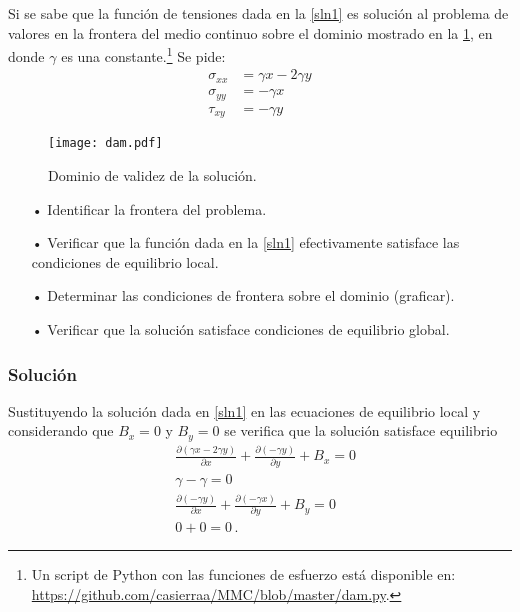 \documentclass[../notas medios.tex]{subfiles}
\begin{document}
Si se sabe que la función de tensiones dada en la \cref{sln1} es solución al problema de valores en la frontera del medio continuo sobre el dominio mostrado en la \cref{dam}, en donde $\gamma$ es una constante.\footnote{Un script de Python con las funciones de esfuerzo está disponible en: \url{https://github.com/casierraa/MMC/blob/master/dam.py}.} Se pide:
\begin{equation}
\begin{split}
\sigma_{xx} & = \gamma x - 2\gamma y \\
\sigma_{yy} & =  - \gamma x \\
\tau_{xy}   & =  - \gamma y
\end{split}
\label{sln1}
\end{equation}

\begin{figure}[H]
\centering
	\texttt{[image: dam.pdf]}
	\caption{Dominio de validez de la solución.}
	\label{dam}
\end{figure}


\begin{itemize}
\item[•] Identificar la frontera del problema.
\item[•] Verificar que la función dada en la \cref{sln1} efectivamente satisface las condiciones de equilibrio local.
\item[•] Determinar las condiciones de frontera sobre el dominio (graficar).
\item[•] Verificar que la solución satisface condiciones de equilibrio global.
\end{itemize}


\subsubsection*{Solución}
Sustituyendo la solución dada en \cref{sln1} en las ecuaciones de equilibrio local y considerando que $B_x =0$ y $B_y =0$ se verifica que la solución satisface equilibrio
\begin{align*}
&\frac{\partial (\gamma x - 2\gamma y)}{\partial x} + \frac{\partial ( - \gamma y)}{\partial y} + B_x = 0\\
&\gamma  - \gamma  = 0\\
&\frac{\partial ( - \gamma y)}{\partial x} + \frac{\partial ( - \gamma x)}{\partial y} + B_y = 0\\
&0 + 0 = 0\, .
\end{align*}
\end{document}
